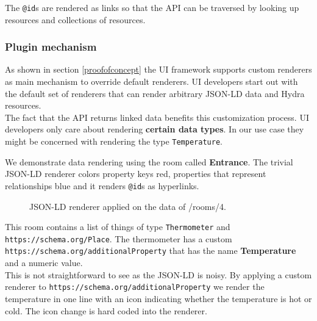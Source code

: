 The \lstinline{@id}s are rendered as links so that the API can be traversed by looking up resources and collections of resources.

\subsubsection{Plugin mechanism}\label{pluginmechanism}
As shown in section \ref{proofofconcept} the UI framework supports custom renderers as main mechanism to override default renderers. UI developers start out with the default set of renderers that can render arbitrary JSON-LD data and Hydra resources. \\
The fact that the API returns linked data benefits this customization process. UI developers only care about rendering \textbf{certain data types}. In our use case they might be concerned with rendering the type \lstinline{Temperature}.

We demonstrate data rendering using the room called \textbf{Entrance}. The trivial JSON-LD renderer colors property keys red, properties that represent relationships blue and it renders \lstinline{@id}s as hyperlinks.

\begin{figure}[!htb]
  \caption{JSON-LD renderer applied on the data of /rooms/4.}
\end{figure}

This room contains a list of things of type \lstinline{Thermometer} and \lstinline{https://schema.org/Place}. The thermometer has a custom \lstinline{https://schema.org/additionalProperty} that has the name \textbf{Temperature} and a numeric value. \\
This is not straightforward to see as the JSON-LD is noisy. By applying a custom renderer to \lstinline{https://schema.org/additionalProperty} we render the temperature in one line with an icon indicating whether the temperature is hot or cold. The icon change is hard coded into the renderer.


